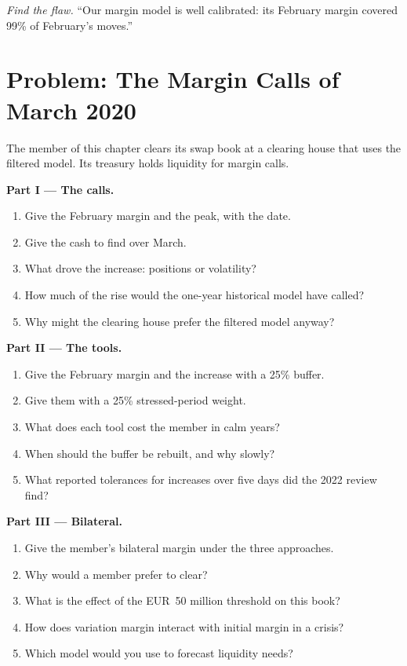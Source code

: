 \begin{exercise}[$\star\star\star$]\label{exo:rc:margin-models:8}
\emph{Find the flaw.} ``Our margin model is well calibrated: its February margin covered 99\% of
February's moves.''
\end{exercise}

\section{Problem: The Margin Calls of March 2020}

\begin{problem}\label{pb:rc:margin-models:1}
The member of this chapter clears its swap book at a clearing house that uses the filtered model. Its
treasury holds liquidity for margin calls.

\medskip\noindent\textbf{Part I --- The calls.}
\begin{enumerate}
\item Give the February margin and the peak, with the date.
\item Give the cash to find over March.
\item What drove the increase: positions or volatility?
\item How much of the rise would the one-year historical model have called?
\item Why might the clearing house prefer the filtered model anyway?
\end{enumerate}

\medskip\noindent\textbf{Part II --- The tools.}
\begin{enumerate}[resume]
\item Give the February margin and the increase with a 25\% buffer.
\item Give them with a 25\% stressed-period weight.
\item What does each tool cost the member in calm years?
\item When should the buffer be rebuilt, and why slowly?
\item What reported tolerances for increases over five days did the 2022 review find?
\end{enumerate}

\medskip\noindent\textbf{Part III --- Bilateral.}
\begin{enumerate}[resume]
\item Give the member's bilateral margin under the three approaches.
\item Why would a member prefer to clear?
\item What is the effect of the EUR~50 million threshold on this book?
\item How does variation margin interact with initial margin in a crisis?
\item Which model would you use to forecast liquidity needs?
\end{enumerate}


\end{problem}
